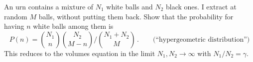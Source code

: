

An urn contains a mixture of $N_1$ white balls and $N_2$ black ones.
I extract at random $M$ balls, without putting them back.
Show that the probability for having $n$ white balls among them is
\begin{equation*}
P(n) = \binom{N_1}{n} \binom{N_2}{M-n} / \binom{N_1 + N_2}{M} \, . \qquad \text{(``hypergeometric distribution'')}
\end{equation*}
This reduces to the volumes equation in the limit $N_1, N_2 \rightarrow \infty$ with $N_1/N_2 = \gamma$.

